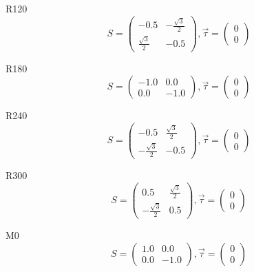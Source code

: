 \documentclass[12pt, fleqn]{article}
\begin{document}
R120
\begin{equation}
    S=
    \begin{pmatrix}
        -0.5&-\frac{\sqrt{3}}{2}\\
        \frac{\sqrt{3}}{2}&-0.5
    \end{pmatrix}
    ,\vec{\tau}=
    \begin{pmatrix}
        0\\
        0
    \end{pmatrix}
    \label{R120}
\end{equation}

R180
\begin{equation}
    S=
    \begin{pmatrix}
        -1.0&0.0\\
        0.0&-1.0
    \end{pmatrix}
    ,\vec{\tau}=
    \begin{pmatrix}
        0\\
        0
    \end{pmatrix}
    \label{R180}
\end{equation}

R240
\begin{equation}
    S=
    \begin{pmatrix}
        -0.5&\frac{\sqrt{3}}{2}\\
        -\frac{\sqrt{3}}{2}&-0.5
    \end{pmatrix}
    ,\vec{\tau}=
    \begin{pmatrix}
        0\\
        0
    \end{pmatrix}
    \label{R240}
\end{equation}

R300
\begin{equation}
    S=
    \begin{pmatrix}
        0.5&\frac{\sqrt{3}}{2}\\
        -\frac{\sqrt{3}}{2}&0.5
    \end{pmatrix}
    ,\vec{\tau}=
    \begin{pmatrix}
        0\\
        0
    \end{pmatrix}
    \label{R300}
\end{equation}

M0
\begin{equation}
    S=
    \begin{pmatrix}
        1.0&0.0\\
        0.0&-1.0
    \end{pmatrix}
    ,\vec{\tau}=
    \begin{pmatrix}
        0\\
        0
    \end{pmatrix}
    \label{M0}
\end{equation}
\end{document}
